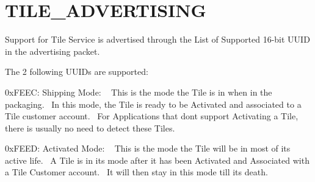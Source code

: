 \hypertarget{group___t_i_l_e___a_d_v_e_r_t_i_s_i_n_g}{}\section{T\+I\+L\+E\+\_\+\+A\+D\+V\+E\+R\+T\+I\+S\+I\+NG}
\label{group___t_i_l_e___a_d_v_e_r_t_i_s_i_n_g}
Support for Tile Service is advertised through the List of Supported 16-\/bit U\+U\+ID in the advertising packet.

The 2 following U\+U\+I\+Ds are supported\+:


\begin{DoxyItemize}
\item 0x\+F\+E\+EC\+: Shipping Mode\+: ~\newline
 This is the mode the Tile is in when in the packaging.~\newline
 In this mode, the Tile is ready to be Activated and associated to a Tile customer account.~\newline
 For Applications that don\textquotesingle{}t support Activating a Tile, there is usually no need to detect these Tiles.~\newline

\item 0x\+F\+E\+ED\+: Activated Mode\+: ~\newline
 This is the mode the Tile will be in most of its active life.~\newline
 A Tile is in its mode after it has been Activated and Associated with a Tile Customer account.~\newline
 It will then stay in this mode till its death.~\newline
 
\end{DoxyItemize}